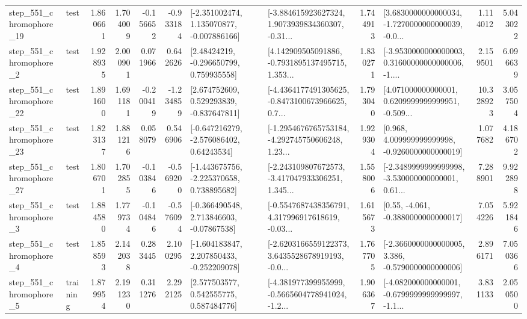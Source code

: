 \begin{tabular}{llrrrrllrlrr}
  step\_551\_chromophore\_19 &      test &      1.860661 &    1.704009 &     -0.156652 & -0.933184 &   [-2.351002474, 1.135070877, -0.007886166] &  [-3.884615923627324, 1.9073939834360307, -0.31... &       1.744913 &  [3.6830000000000034, -1.7270000000000039, -0.0... &            1.114012 &          5.043022 \\
   step\_551\_chromophore\_2 &      test &      1.928935 &    2.000901 &      0.071966 &  0.642626 &     [2.48424219, -0.296650799, 0.759935558] &  [4.142909505091886, -0.7931895137495715, 1.353... &       1.830271 &  [-3.9530000000000003, 0.31600000000000006, -1.... &            2.159501 &          6.096639 \\
  step\_551\_chromophore\_22 &      test &      1.891600 &    1.691181 &     -0.200419 & -1.234859 &    [2.674752609, 0.529293839, -0.837647811] &  [-4.4364177491305625, -0.8473100673966625, 0.7... &       1.793040 &  [4.071000000000001, 0.6209999999999951, -0.509... &           10.328923 &          3.057504 \\
  step\_551\_chromophore\_23 &      test &      1.823137 &    1.881216 &      0.058079 &  0.546906 &    [-0.647216279, -2.576086402, 0.64243534] &  [-1.2954676765753184, -4.292745750606248, 1.23... &       1.929304 &    [0.968, 4.009999999999998, -0.9260000000000019] &            1.077682 &          4.186702 \\
  step\_551\_chromophore\_27 &      test &      1.806701 &    1.702855 &     -0.103846 & -0.569200 &   [-1.443675756, -2.225370658, 0.738895682] &  [-2.243109807672573, -3.417047933306251, 1.345... &       1.558006 &  [-2.3489999999999998, -3.530000000000001, 0.61... &            7.288901 &          9.922898 \\
   step\_551\_chromophore\_3 &      test &      1.884580 &    1.779734 &     -0.104846 & -0.576094 &    [-0.366490548, 2.713846603, -0.07867538] &  [-0.5547687438356791, 4.317996917618619, -0.03... &       1.615673 &                [0.55, -4.061, -0.3880000000000017] &            7.054226 &          5.921846 \\
   step\_551\_chromophore\_4 &      test &      1.858593 &    2.142038 &      0.283445 &  2.100295 &   [-1.604183847, 2.207850433, -0.252209078] &  [-2.6203166559122373, 3.6435528678919193, -0.0... &       1.767705 &  [-2.3660000000000005, 3.386, -0.5790000000000006] &            2.896171 &          7.050366 \\
   step\_551\_chromophore\_5 &  training &      1.879954 &    2.191230 &      0.311276 &  2.292125 &     [2.577503577, 0.542555775, 0.587484776] &  [-4.381977399955999, -0.5665604778941024, -1.2... &       1.906367 &  [-4.082000000000001, -0.6799999999999997, -1.1... &            3.831133 &          2.050500 \\

\end{tabular}
